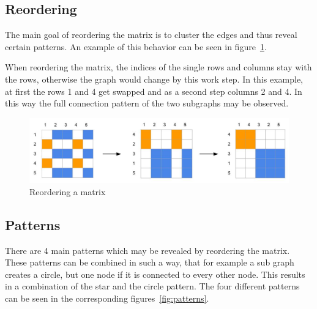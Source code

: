 \FloatBarrier
\subsection{Reordering}

The main goal of reordering the matrix is to cluster the edges and thus reveal certain patterns. An example of this behavior can be seen in figure~\ref{fig:reorder}. 


When reordering the matrix, the indices of the single rows and columns stay with the rows, otherwise the graph would change by this work step. In this example, at first the rows 1 and 4 get swapped and as a second step columns 2 and 4. In this way the full connection pattern of the two subgraphs may be observed. 


\begin{figure}[ht]
\includegraphics[width=\textwidth]{images/reorder}
\caption[Reordering a Matrix]{Reordering a matrix\label{fig:reorder}}
\end{figure}

\FloatBarrier

\subsection{Patterns}

There are 4 main patterns which may be revealed by reordering the matrix. These patterns can be combined in such a way, that for example a sub graph creates a circle, but one node if it is connected to every other node. This results in a combination of the star and the circle pattern. 
The four different patterns can be seen in the corresponding figures~\ref{fig:patterns}.

